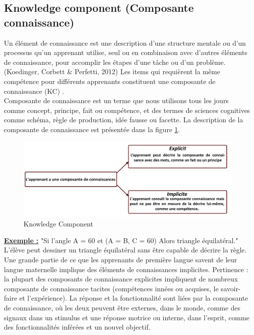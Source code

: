 \subsection{Knowledge component (Composante connaissance)}
Un élément de connaissance est une description d'une structure mentale ou d'un processus qu'un apprenant utilise, seul ou en combinaison avec d'autres éléments de connaissance, pour accomplir les étapes d'une tâche ou d'un problème. (Koedinger, Corbett \& Perfetti, 2012) Les items qui requièrent la même compétence pour différents apprenants constituent une composante de connaissance (KC) \cite{nazaretsky2018kappa}. \\
Composante de connaissance est un terme que nous utilisons tous les jours comme concept, principe, fait ou compétence, et des termes de sciences cognitives comme schéma, règle de production, idée fausse ou facette. \cite{vanlehn2006behavior}
La description de la composante de connaissance est présentée dans la figure \ref{knowledge_component}.

\begin{figure}[H]
	\begin{center}
		\includegraphics[width=\textwidth]{images/chapitre3/Knowledge_component.png}
	\end{center}
\caption{Knowledge Component}
\label{knowledge_component}
\end{figure}
\textbf{\underline{Exemple :}}
"Si l'angle A = 60 et (A = B, C = 60) Alors triangle équilatéral." \\
L'élève peut dessiner un triangle équilatéral sans être capable de décrire la règle. Une grande partie de ce que les apprenants de première langue savent de leur langue maternelle implique des éléments de connaissances implicites. Pertinence : la plupart des composants de connaissance explicites impliquent de nombreux composants de connaissance tacites (compétences innées ou acquises, le savoir-faire et l'expérience). La réponse et la fonctionnalité sont liées par la composante de connaissance, où les deux peuvent être externes, dans le monde, comme des signaux dans un stimulus et une réponse motrice ou interne, dans l'esprit, comme des fonctionnalités inférées et un nouvel objectif\cite{vanlehn2006behavior}.

